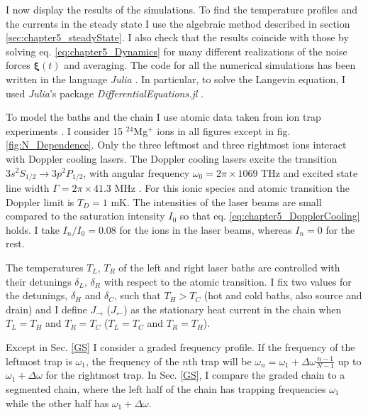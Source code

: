 I now display the results of the simulations. To find the temperature profiles and the currents in the steady state I use the algebraic method described in section \ref{sec:chapter5_steadyState}. I also check that the results coincide with those by solving eq. \eqref{eq:chapter5_Dynamics} for many different realizations of the noise forces $\bm\xi (t)$ and averaging. The code for all the numerical simulations has been written in the language \textit{Julia} \cite{Bezanson2012,Bezanson2017}. In particular, to solve the Langevin equation, I used \textit{Julia}'s package \textit{DifferentialEquations.jl} \cite{Rackauckas2017}.

To model the baths and the chain I use atomic data taken from ion trap experiments \cite{Leupold2015,Lo2015}. I consider 15 $^{24}$Mg$^+$ ions in all figures except in fig. \ref{fig:N_Dependence}. Only the three leftmost and three rightmost ions interact with Doppler cooling lasers. The Doppler cooling lasers excite the transition $3s^2S_{1/2}\rightarrow 3p^2P_{1/2}$, with angular frequency $\omega_0 = 2 \pi \times 1069$ THz and excited state line width $\Gamma = 2\pi \times 41.3$ MHz \cite{Ruiz2014}. For this ionic species and atomic transition the Doppler limit is $T_D = 1$ mK.
The intensities of the laser beams are small compared to the saturation intensity $I_0$ so that eq. \eqref{eq:chapter5_DopplerCooling} holds. I take $I_n/I_0 = 0.08$ for the ions  in the laser beams, whereas  $I_n=0$ for the rest.

The temperatures $T_L,\,T_R$ of the left and right laser baths are controlled with their detunings $\delta_L,\,\delta_R$ with respect to the atomic transition. I fix two values for the detunings, $\delta_H$ and $\delta_C$, such that $T_H>T_C$ (hot and cold baths, also source and drain) and I define $J_\rightarrow$ ($J_\leftarrow$) as the stationary heat current in the chain when $T_L = T_H$ and $T_R = T_C$ ($T_L = T_C$ and $T_R = T_H$).

Except in Sec. \ref{GS} I consider a graded frequency profile.
If the frequency of the leftmost trap is $\omega_1$, the frequency of the $n$th trap will be $\omega_n = \omega_1 +\Delta\omega\frac{n-1}{N-1}$ up to $\omega_1 +\Delta\omega$ for the rightmost trap. In
Sec. \ref{GS}, I compare the graded chain to a segmented chain, where the left half of the chain has trapping frequencies $\omega_1$ while the other half has $\omega_1 +\Delta\omega$.



